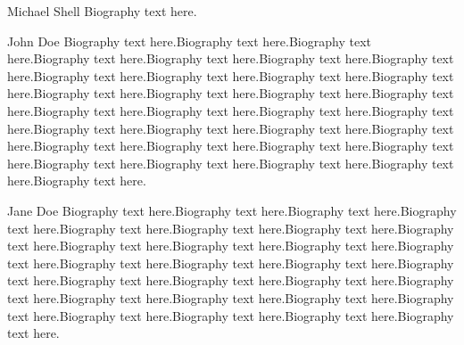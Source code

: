 \documentclass[10pt,journal,cspaper,compsoc]{IEEEtran}
\begin{document}
\begin{IEEEbiography}{Michael Shell}
Biography text here.
\end{IEEEbiography}

\begin{IEEEbiographynophoto}{John Doe}
Biography text here.Biography text here.Biography text here.Biography text here.Biography text here.Biography text here.Biography text here.Biography text here.Biography text here.Biography text here.Biography text here.Biography text here.Biography text here.Biography text here.Biography text here.Biography text here.Biography text here.Biography text here.Biography text here.Biography text here.Biography text here.Biography text here.Biography text here.Biography text here.Biography text here.Biography text here.Biography text here.Biography text here.Biography text here.Biography text here.Biography text here.Biography text here.
\end{IEEEbiographynophoto}


\begin{IEEEbiographynophoto}{Jane Doe}
Biography text here.Biography text here.Biography text here.Biography text here.Biography text here.Biography text here.Biography text here.Biography text here.Biography text here.Biography text here.Biography text here.Biography text here.Biography text here.Biography text here.Biography text here.Biography text here.Biography text here.Biography text here.Biography text here.Biography text here.Biography text here.Biography text here.Biography text here.Biography text here.Biography text here.Biography text here.Biography text here.Biography text here.
\end{IEEEbiographynophoto}






\end{document}
